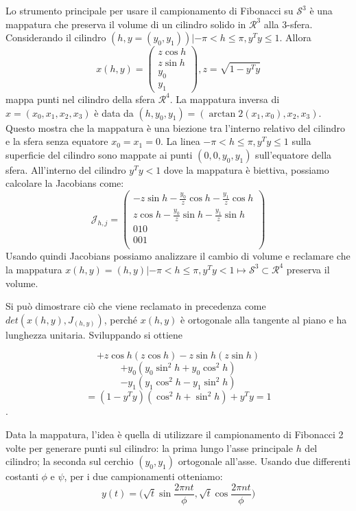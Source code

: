 Lo strumento principale per usare il campionamento di Fibonacci su $\mathcal{S}^3$ è una mappatura che preserva il volume di un cilindro solido in $\mathcal{R}^3$ alla 3-sfera. Considerando il cilindro ${(h, y = (y_0, y_1))| -\pi < h \le \pi, y^Ty \le 1}$. Allora 
$$
	x(h, y) = \begin{pmatrix}
				z \cos{h} \\
				z \sin{h} \\
				y_0 \\
				y_1  
			  \end{pmatrix}, z = \sqrt{1 - y^Ty}
$$
mappa punti nel cilindro della sfera $\mathcal{R}^4$. La mappatura inversa di $x = (x_0, x_1, x_2, x_3)$ è data da $(h, y_0, y_1) = (\arctan2(x_1,x_0),x_2,x_3)$. Questo mostra che la mappatura è una biezione tra l'interno relativo del cilindro e la sfera senza equatore $x_0 = x_1 = 0$. La linea ${-\pi < h \le \pi, y^Ty \le 1}$ sulla superficie del cilindro sono mappate ai punti $(0, 0, y_0, y_1)$ sull'equatore della sfera. All'interno del cilindro $y^Ty < 1$ dove la mappatura è biettiva, possiamo calcolare la Jacobians come: 
$$
	\mathcal{J}_{h, j} = \begin{pmatrix}
		-z\sin{h} -\frac{y_0}{z}\cos{h} -\frac{y_1}{z}\cos{h} \\
		z\cos{h} -\frac{y_0}{z}\sin{h} -\frac{y_1}{z}\sin{h} \\
		0 1 0 \\
		0 0 1 \\
	\end{pmatrix}
$$
Usando quindi Jacobians possiamo analizzare il cambio di volume e reclamare che la mappatura $x(h, y) = {(h, y)| -\pi < h \le \pi, y^Ty < 1} \mapsto \mathcal{S}^3 \subset \mathcal{R}^4$ preserva il volume. 

Si può dimostrare ciò che viene reclamato in precedenza come $det(x(h, y), J_(h, y))$, perché $x(h, y)$ è ortogonale alla tangente al piano e ha lunghezza unitaria. Sviluppando si ottiene

$$
	+z \cos{h}(z \cos{h}) - z \sin{h}(z \sin{h})
$$
$$
	+y_0 (y_0 \sin^2{h} + y_0 \cos^2{h}) 
$$
$$
	-y_1 (y_1 \cos^2{h} - y_1 \sin^2{h}) 
$$
$$
	= (1 - y^Ty)(\cos^2{h} + \sin^2{h}) + y^Ty = 1
$$.

Data la mappatura, l'idea è quella di utilizzare il campionamento di Fibonacci 2 volte per generare punti sul cilindro: la prima lungo l'asse principale $h$ del cilindro; la seconda sul cerchio $(y_0, y_1)$ ortogonale all'asse. Usando due differenti costanti $\phi$ e $\psi$, per i due campionamenti otteniamo:
$$
	y(t) = \bigg(\sqrt{t}\sin{\frac{2\pi nt}{\phi}}, \sqrt{t}\cos{\frac{2\pi nt}{\phi}} \bigg)
$$

